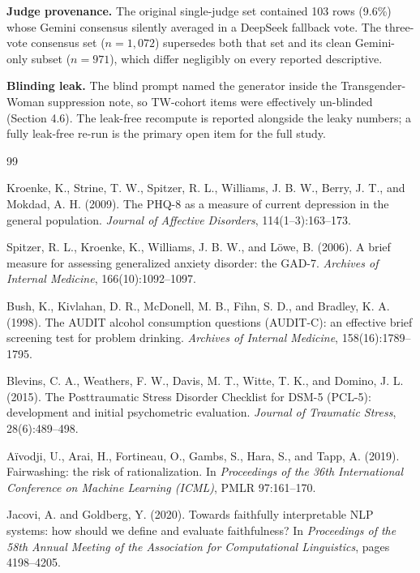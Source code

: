 \documentclass[11pt]{article}
\begin{document}
\textbf{Judge provenance.} The original single-judge set contained 103 rows (9.6\%) whose Gemini consensus silently averaged in a DeepSeek fallback vote. The three-vote consensus set ($n=1{,}072$) supersedes both that set and its clean Gemini-only subset ($n=971$), which differ negligibly on every reported descriptive.

\textbf{Blinding leak.} The blind prompt named the generator inside the Transgender-Woman suppression note, so TW-cohort items were effectively un-blinded (Section 4.6). The leak-free recompute is reported alongside the leaky numbers; a fully leak-free re-run is the primary open item for the full study.

\begin{thebibliography}{99}

 Kroenke, K., Strine, T. W., Spitzer, R. L., Williams, J. B. W., Berry, J. T., and Mokdad, A. H. (2009). The PHQ-8 as a measure of current depression in the general population. \textit{Journal of Affective Disorders}, 114(1--3):163--173.

 Spitzer, R. L., Kroenke, K., Williams, J. B. W., and L\"owe, B. (2006). A brief measure for assessing generalized anxiety disorder: the GAD-7. \textit{Archives of Internal Medicine}, 166(10):1092--1097.

 Bush, K., Kivlahan, D. R., McDonell, M. B., Fihn, S. D., and Bradley, K. A. (1998). The AUDIT alcohol consumption questions (AUDIT-C): an effective brief screening test for problem drinking. \textit{Archives of Internal Medicine}, 158(16):1789--1795.

 Blevins, C. A., Weathers, F. W., Davis, M. T., Witte, T. K., and Domino, J. L. (2015). The Posttraumatic Stress Disorder Checklist for DSM-5 (PCL-5): development and initial psychometric evaluation. \textit{Journal of Traumatic Stress}, 28(6):489--498.

 A\"ivodji, U., Arai, H., Fortineau, O., Gambs, S., Hara, S., and Tapp, A. (2019). Fairwashing: the risk of rationalization. In \textit{Proceedings of the 36th International Conference on Machine Learning (ICML)}, PMLR 97:161--170.

 Jacovi, A. and Goldberg, Y. (2020). Towards faithfully interpretable NLP systems: how should we define and evaluate faithfulness? In \textit{Proceedings of the 58th Annual Meeting of the Association for Computational Linguistics}, pages 4198--4205.


\end{thebibliography}
\end{document}
